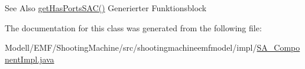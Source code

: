 \begin{DoxySeeAlso}{See Also}
\hyperlink{classshootingmachineemfmodel_1_1impl_1_1_s_a___component_impl_a33cf8cec28514b7843445dc395c5b072}{get\-Has\-Ports\-S\-A\-C()} Generierter Funktionsblock  
\end{DoxySeeAlso}


The documentation for this class was generated from the following file\-:\begin{DoxyCompactItemize}
\item 
Modell/\-E\-M\-F/\-Shooting\-Machine/src/shootingmachineemfmodel/impl/\hyperlink{_s_a___component_impl_8java}{S\-A\-\_\-\-Component\-Impl.\-java}\end{DoxyCompactItemize}
